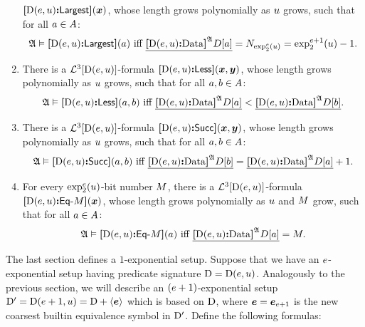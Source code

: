 \begin{definition}
\begin{enumerate}[label=E\arabic*]
  ${\bm{[}{\mathrm{D}}(e,u)\mathord{\bm{:}}\mathsf{Largest}\bm{]}}(\bm{x})$, whose length grows polynomially as $u$ grows,
  such that for all $a \in A$:
  \[
    \miff{
      \StrA \vDash \fMax{\DS(\sze,\szu)}(\ea)}{
      \bdec{\Data{\DS(\sze,\szu)}\StrA\relD[\ea]} = \largtbit{\tetr\sze2\szu} =
      \tetr{\sze+1}2\szu-1}.
  \]
  \item\label{eset:6} There is a $\mathcal{L}^{3}[{\mathrm{D}}(e,u)]$-formula
  ${\bm{[}{\mathrm{D}}(e,u)\mathord{\bm{:}}\mathsf{Less}\bm{]}}(\bm{x},\bm{y})$, whose length grows polynomially as $u$
  grows, such that for all $a, b \in A$:
  \[
    \miff{
      \StrA \vDash \fLess{\DS(\sze,\szu)}(\ea,\eb)}{
      \bdec{\Data{\DS(\sze,\szu)}\StrA\relD[\ea]} <
      \bdec{\Data{\DS(\sze,\szu)}\StrA\relD[\eb]}}.
  \]
  \item\label{eset:7} There is a $\mathcal{L}^{3}[{\mathrm{D}}(e,u)]$-formula
  ${\bm{[}{\mathrm{D}}(e,u)\mathord{\bm{:}}\mathsf{Succ}\bm{]}}(\bm{x},\bm{y})$, whose length grows polynomially as $u$
  grows, such that for all $a, b \in A$:
  \[
    \miff{
      \StrA \vDash \fSucc{\DS(\sze,\szu)}(\ea,\eb)}{
      \bdec{\Data{\DS(\sze,\szu)}\StrA\relD[\eb]} =
      \bdec{\Data{\DS(\sze,\szu)}\StrA\relD[\ea]} + 1}.
  \]
  \item\label{eset:8} For every $\exp_{2}^{e}(u)$-bit number $M$, there is a
  $\mathcal{L}^{3}[{\mathrm{D}}(e,u)]$-formula
  ${\bm{[}{\mathrm{D}}(e,u)\mathord{\bm{:}}\mathsf{Eq}{\hbox{-}}M\bm{]}}(\bm{x})$, whose length grows polynomially as $u$
  and $M$ grow, such that for all $a \in  A$:
  \[
    \miff{
      \StrA \vDash \fDataA{\DS(\sze,\szu)}\nM(\ea)}{
      \bdec{\Data{\DS(\sze,\szu)}\StrA\relD[\ea]} = \nM}.
  \]
\end{enumerate}
\end{definition}
The last section defines a $1$-exponential setup.
Suppose that we have an $e$-exponential setup having predicate signature
${\mathrm{D}} = {\mathrm{D}}(e,u)$. Analogously to the previous section, we will describe an
$(e+1)$-exponential setup ${\mathrm{D'}} = {\mathrm{D}}(e+1,u) = {\mathrm{D}} + \left\langle \bm{e} \right\rangle$ which
is based on ${\mathrm{D}}$, where $\bm{e} = \bm{e}_{e+1}$ is the new coarsest builtin
equivalence symbol in ${\mathrm{D'}}$. Define the following formulas:
